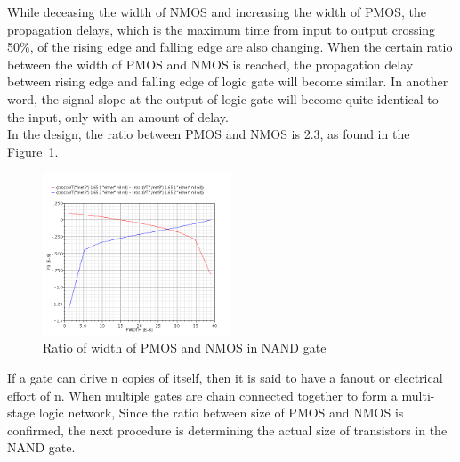 While deceasing the width of NMOS and increasing the width of PMOS, the propagation delays, which is the maximum time from input to output crossing 50\%, of the rising edge and falling edge are also changing. When the certain ratio between the width of PMOS and NMOS is reached, the propagation delay between rising edge and falling edge of logic gate will become similar. In another word, the signal slope at the output of logic gate will become quite identical to the input, only with an amount of delay.\\
In the design, the ratio between PMOS and NMOS is 2.3, as found in the Figure~\ref{fig:NANDratio}.
\begin{figure}[hf]
		\centering
		\includegraphics[width = 0.5\textwidth]{Figures/NANDratio}		
		\caption{Ratio of width of PMOS and NMOS in NAND gate}
		\label {fig:NANDratio}
\end{figure}

If a gate can drive n copies of itself, then it is said to have a fanout or electrical effort of n. When multiple gates are chain connected together to form a multi-stage logic network, Since the ratio between size of PMOS and NMOS is confirmed, the next procedure is determining the actual size of transistors in the NAND gate.
